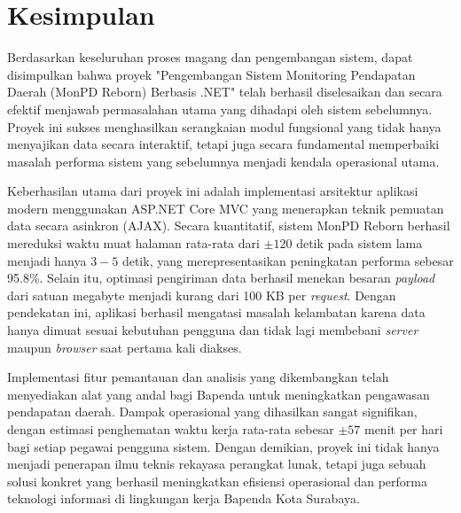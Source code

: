 \section{Kesimpulan}
\label{sec:kesimpulan}

Berdasarkan keseluruhan proses magang dan pengembangan sistem, dapat disimpulkan bahwa proyek "Pengembangan Sistem Monitoring Pendapatan Daerah (MonPD Reborn) Berbasis .NET" telah berhasil diselesaikan dan secara efektif menjawab permasalahan utama yang dihadapi oleh sistem sebelumnya. Proyek ini sukses menghasilkan serangkaian modul fungsional yang tidak hanya menyajikan data secara interaktif, tetapi juga secara fundamental memperbaiki masalah performa sistem yang sebelumnya menjadi kendala operasional utama.

Keberhasilan utama dari proyek ini adalah implementasi arsitektur aplikasi modern menggunakan ASP.NET Core MVC yang menerapkan teknik pemuatan data secara asinkron (AJAX). Secara kuantitatif, sistem MonPD Reborn berhasil mereduksi waktu muat halaman rata-rata dari $\pm120$ detik pada sistem lama menjadi hanya $3-5$ detik, yang merepresentasikan peningkatan performa sebesar 95.8\%. Selain itu, optimasi pengiriman data berhasil menekan besaran \textit{payload} dari satuan megabyte menjadi kurang dari 100 KB per \emph{request}. Dengan pendekatan ini, aplikasi berhasil mengatasi masalah kelambatan karena data hanya dimuat sesuai kebutuhan pengguna dan tidak lagi membebani \textit{server} maupun \textit{browser} saat pertama kali diakses.

Implementasi fitur pemantauan dan analisis yang dikembangkan telah menyediakan alat yang andal bagi Bapenda untuk meningkatkan pengawasan pendapatan daerah. Dampak operasional yang dihasilkan sangat signifikan, dengan estimasi penghematan waktu kerja rata-rata sebesar $\pm57$ menit per hari bagi setiap pegawai pengguna sistem. Dengan demikian, proyek ini tidak hanya menjadi penerapan ilmu teknis rekayasa perangkat lunak, tetapi juga sebuah solusi konkret yang berhasil meningkatkan efisiensi operasional dan performa teknologi informasi di lingkungan kerja Bapenda Kota Surabaya.